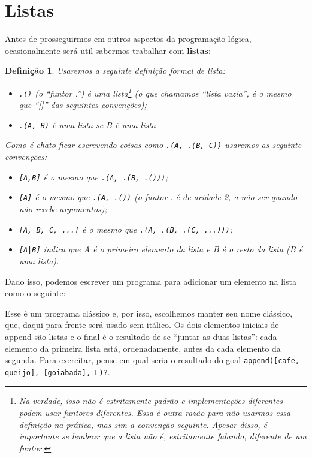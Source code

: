 \documentclass{article}
\newtheorem{definition}{Definição}[section]
\theoremstyle{remark}
\begin{document}
\section{Listas}

Antes de prosseguirmos em outros aspectos da programação lógica, ocasionalmente será util sabermos trabalhar com \textbf{listas}:

\begin{definition}
  Usaremos a seguinte definição formal de lista:
  \begin{itemize}
    \item {\tt .()} (o ``funtor .'') é uma lista\footnote{Na verdade, isso não é estritamente padrão e implementações diferentes podem usar funtores diferentes. Essa é outra razão para não usarmos essa definição na prática, mas sim a convenção seguinte. Apesar disso, é importante se lembrar que a lista não é, estritamente falando, diferente de um funtor.} (o que chamamos ``lista vazia'', é o mesmo que ``[]'' das seguintes convenções);
    \item {\tt .(A, B)} é uma lista se B é uma lista
  \end{itemize}
  Como é chato ficar escrevendo coisas como {\tt.(A, .(B, C))} usaremos as seguinte convenções:
  \begin{itemize}
    \item {\tt [A,B]} é o mesmo que {\tt .(A, .(B, .()))};
    \item {\tt [A]} é o mesmo que {\tt .(A, .())} (o funtor . é de aridade 2, a não ser quando não recebe argumentos);
    \item {\tt [A, B, C, ...]} é o mesmo que {\tt .(A, .(B, .(C, ...)))};
    \item {\tt [A|B]} indica que A é o primeiro elemento da lista e B é o resto da lista (B é uma lista).
  \end{itemize}
\end{definition}

Dado isso, podemos escrever um programa para adicionar um elemento na lista como o seguinte:



Esse é um programa clássico e, por isso, escolhemos manter seu nome clássico, que, daqui para frente será usado sem itálico. Os dois elementos iniciais de append são listas e o final é o resultado de se ``juntar as duas listas'': cada elemento da primeira lista está, ordenadamente, antes da cada elemento da segunda. Para exercitar, pense em qual seria o resultado do goal {\tt append([cafe, queijo], [goiabada], L)?}.
\end{document}
